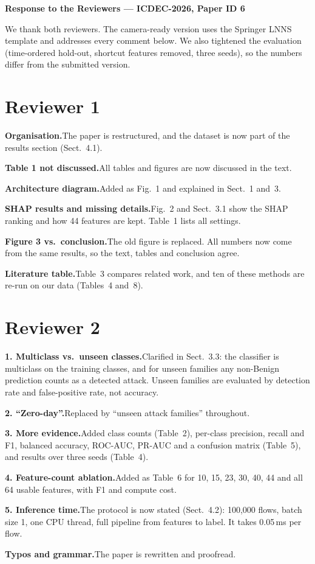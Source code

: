 \documentclass[10pt,a4paper]{article}
\newcommand{\point}[2]{\textbf{#1}\quad #2\par}
\begin{document}
{\large\textbf{Response to the Reviewers --- ICDEC-2026, Paper ID 6}}

We thank both reviewers. The camera-ready version uses the Springer LNNS template and addresses every comment below. We also tightened the evaluation (time-ordered hold-out, shortcut features removed, three seeds), so the numbers differ from the submitted version.

\section*{Reviewer 1}

\point{Organisation.}{The paper is restructured, and the dataset is now part of the results section (Sect.~4.1).}

\point{Table 1 not discussed.}{All tables and figures are now discussed in the text.}

\point{Architecture diagram.}{Added as Fig.~1 and explained in Sect.~1 and~3.}

\point{SHAP results and missing details.}{Fig.~2 and Sect.~3.1 show the SHAP ranking and how 44 features are kept. Table~1 lists all settings.}

\point{Figure 3 vs.\ conclusion.}{The old figure is replaced. All numbers now come from the same results, so the text, tables and conclusion agree.}

\point{Literature table.}{Table~3 compares related work, and ten of these methods are re-run on our data (Tables~4 and~8).}

\section*{Reviewer 2}

\point{1. Multiclass vs.\ unseen classes.}{Clarified in Sect.~3.3: the classifier is multiclass on the training classes, and for unseen families any non-Benign prediction counts as a detected attack. Unseen families are evaluated by detection rate and false-positive rate, not accuracy.}

\point{2. ``Zero-day''.}{Replaced by ``unseen attack families'' throughout.}

\point{3. More evidence.}{Added class counts (Table~2), per-class precision, recall and F1, balanced accuracy, ROC-AUC, PR-AUC and a confusion matrix (Table~5), and results over three seeds (Table~4).}

\point{4. Feature-count ablation.}{Added as Table~6 for 10, 15, 23, 30, 40, 44 and all 64 usable features, with F1 and compute cost.}

\point{5. Inference time.}{The protocol is now stated (Sect.~4.2): 100{,}000 flows, batch size 1, one CPU thread, full pipeline from features to label. It takes 0.05\,ms per flow.}

\point{Typos and grammar.}{The paper is rewritten and proofread.}
\end{document}
